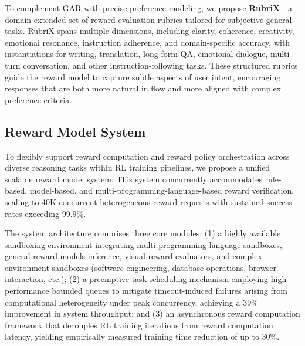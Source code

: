 To complement GAR with precise preference modeling, we propose \textbf{RubriX}—a domain-extended set of reward evaluation rubrics tailored for subjective general tasks. 
RubriX spans multiple dimensions, including clarity, coherence, creativity, emotional resonance, instruction adherence, and domain-specific accuracy, with instantiations for writing, translation, long-form QA, emotional dialogue, multi-turn conversation, and other instruction-following tasks. 
These structured rubrics guide the reward model to capture subtle aspects of user intent, encouraging responses that are both more natural in flow and more aligned with complex preference criteria.

\subsection{Reward Model System}
To flexibly support reward computation and reward policy orchestration across diverse reasoning tasks within RL training pipelines, we propose a unified scalable reward model system. This system concurrently accommodates rule-based, model-based, and multi-programming-language-based reward verification, scaling to 40K concurrent heterogeneous reward requests with sustained success rates exceeding 99.9\%.

The system architecture comprises three core modules: (1) a highly available sandboxing environment integrating multi-programming-language sandboxes, general reward models inference, visual reward evaluators, and complex environment sandboxes (software engineering, database operations, browser interaction, etc.); (2) a preemptive task scheduling mechanism employing high-performance bounded queues to mitigate timeout-induced failures arising from computational heterogeneity under peak concurrency, achieving a 39\% improvement in system throughput; and (3) an asynchronous reward computation framework that decouples RL training iterations from reward computation latency, yielding empirically measured training time reduction of up to 30\%.








